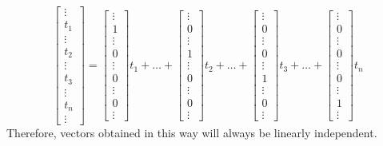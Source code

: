 \documentclass{ximera}
\begin{document}
$$\begin{bmatrix}\vdots \\t_1\\\vdots\\t_2\\\vdots\\t_3\\\vdots\\t_n\\\vdots \end{bmatrix}=\begin{bmatrix}\vdots \\1\\\vdots\\0\\\vdots\\0\\\vdots\\0\\\vdots \end{bmatrix}t_1+\ldots +\begin{bmatrix}\vdots \\0\\\vdots\\1\\\vdots\\0\\\vdots\\0\\\vdots \end{bmatrix}t_2+\ldots+\begin{bmatrix}\vdots \\0\\\vdots\\0\\\vdots\\1\\\vdots\\0\\\vdots \end{bmatrix}t_3+\ldots+\begin{bmatrix}\vdots \\0\\\vdots\\0\\\vdots\\0\\\vdots\\1\\\vdots \end{bmatrix}t_n$$
Therefore, vectors obtained in this way will always be linearly independent.

\end{document}
